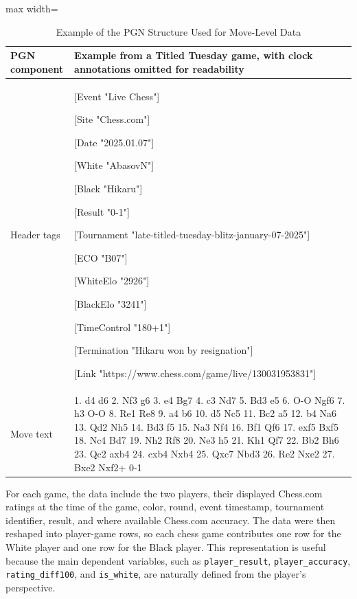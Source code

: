 \begin{table}[H]
\centering
\caption{Example of the PGN Structure Used for Move-Level Data}
\label{tab:pgn-format-example}
\begin{adjustbox}{max width=\textwidth}
\begin{tabular}{p{}p{}}
\toprule
PGN component & Example from a Titled Tuesday game, with clock annotations omitted for readability \\
\midrule
Header tags &
\begin{minipage}[t]{0.70\textwidth}
\ttfamily\footnotesize
\noindent{}[Event "Live Chess"]\par
\noindent{}[Site "Chess.com"]\par
\noindent{}[Date "2025.01.07"]\par
\noindent{}[White "AbasovN"]\par
\noindent{}[Black "Hikaru"]\par
\noindent{}[Result "0-1"]\par
\noindent{}[Tournament "late-titled-tuesday-blitz-january-07-2025"]\par
\noindent{}[ECO "B07"]\par
\noindent{}[WhiteElo "2926"]\par
\noindent{}[BlackElo "3241"]\par
\noindent{}[TimeControl "180+1"]\par
\noindent{}[Termination "Hikaru won by resignation"]\par
\noindent{}[Link "https://www.chess.com/game/live/130031953831"]
\end{minipage}
\\
\midrule
Move text &
\begin{minipage}[t]{0.70\textwidth}
\ttfamily\footnotesize
1. d4 d6 2. Nf3 g6 3. e4 Bg7 4. c3 Nd7 5. Bd3 e5 6. O-O Ngf6 7. h3 O-O 8. Re1 Re8 9. a4 b6 10. d5 Nc5 11. Bc2 a5 12. b4 Na6 13. Qd2 Nh5 14. Bd3 f5 15. Na3 Nf4 16. Bf1 Qf6 17. exf5 Bxf5 18. Nc4 Bd7 19. Nh2 Rf8 20. Ne3 h5 21. Kh1 Qf7 22. Bb2 Bh6 23. Qc2 axb4 24. cxb4 Nxb4 25. Qxc7 Nbd3 26. Re2 Nxe2 27. Bxe2 Nxf2+ 0-1
\end{minipage}
\\
\bottomrule
\end{tabular}
\end{adjustbox}
\end{table}

For each game, the data include the two players, their displayed Chess.com ratings at the time of the game, color, round, event timestamp, tournament identifier, result, and where available Chess.com accuracy. The data were then reshaped into player-game rows, so each chess game contributes one row for the White player and one row for the Black player. This representation is useful because the main dependent variables, such as \texttt{player\_result}, \texttt{player\_accuracy}, \texttt{rating\_diff100}, and \texttt{is\_white}, are naturally defined from the player's perspective.

